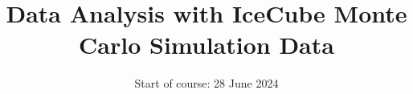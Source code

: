 

\title{Data Analysis with IceCube Monte Carlo
Simulation Data}
\date{%
  Start of course: 28 June 2024
}



\maketitle
\thispagestyle{empty}
\tableofcontents
\newpage






\printbibliography{}

%


